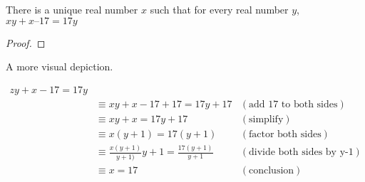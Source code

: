 
\begin{theorem}
  There is a unique real number $x$ such that for every real number $y$, $xy+x–17= 17y$
\end{theorem}

\begin{proof}

\end{proof}

A more visual depiction.

\begin{align*}
  zy+x-17=17y\\
  &\equiv xy+x-17+17=17y+17 &(\textrm{add 17 to both sides})\\
  &\equiv xy+x=17y+17 &(\textrm{simplify})\\
  &\equiv x(y+1)=17(y+1) &(\textrm{factor both sides})\\
  &\equiv \frac{x(y+1)}{y+1)}{y+1}=\frac{17(y+1)}{y+1} &(\textrm{divide both
  sides by y-1})\\
  &\equiv x=17 &(\textrm{conclusion})
\end{align*}
